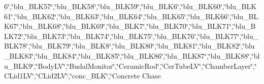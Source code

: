 {6\char`\"{},\char`\"{}blu\-\_\-\-B\-L\-K57\char`\"{},\char`\"{}blu\-\_\-\-B\-L\-K58\char`\"{},\char`\"{}blu\-\_\-\-B\-L\-K59\char`\"{},\char`\"{}blu\-\_\-\-B\-L\-K6\char`\"{},\char`\"{}blu\-\_\-\-B\-L\-K60\char`\"{},\char`\"{}blu\-\_\-\-B\-L\-K61\char`\"{},\char`\"{}blu\-\_\-\-B\-L\-K62\char`\"{},\char`\"{}blu\-\_\-\-B\-L\-K63\char`\"{},\char`\"{}blu\-\_\-\-B\-L\-K64\char`\"{},\char`\"{}blu\-\_\-\-B\-L\-K65\char`\"{},\char`\"{}blu\-\_\-\-B\-L\-K66\char`\"{},\char`\"{}blu\-\_\-\-B\-L\-K67\char`\"{},\char`\"{}blu\-\_\-\-B\-L\-K68\char`\"{},\char`\"{}blu\-\_\-\-B\-L\-K69\char`\"{},\char`\"{}blu\-\_\-\-B\-L\-K7\char`\"{},\char`\"{}blu\-\_\-\-B\-L\-K70\char`\"{},\char`\"{}blu\-\_\-\-B\-L\-K71\char`\"{},\char`\"{}blu\-\_\-\-B\-L\-K72\char`\"{},\char`\"{}blu\-\_\-\-B\-L\-K73\char`\"{},\char`\"{}blu\-\_\-\-B\-L\-K74\char`\"{},\char`\"{}blu\-\_\-\-B\-L\-K75\char`\"{},\char`\"{}blu\-\_\-\-B\-L\-K76\char`\"{},\char`\"{}blu\-\_\-\-B\-L\-K77\char`\"{},\char`\"{}blu\-\_\-\-B\-L\-K78\char`\"{},\char`\"{}blu\-\_\-\-B\-L\-K79\char`\"{},\char`\"{}blu\-\_\-\-B\-L\-K8\char`\"{},\char`\"{}blu\-\_\-\-B\-L\-K80\char`\"{},\char`\"{}blu\-\_\-\-B\-L\-K81\char`\"{},\char`\"{}blu\-\_\-\-B\-L\-K82\char`\"{},\char`\"{}blu\-\_\-\-B\-L\-K83\char`\"{},\char`\"{}blu\-\_\-\-B\-L\-K84\char`\"{},\char`\"{}blu\-\_\-\-B\-L\-K85\char`\"{},\char`\"{}blu\-\_\-\-B\-L\-K86\char`\"{},\char`\"{}blu\-\_\-\-B\-L\-K87\char`\"{},\char`\"{}blu\-\_\-\-B\-L\-K88\char`\"{},\char`\"{}blu\-\_\-\-B\-L\-K9\char`\"{},\char`\"{}Body\-L\-V\char`\"{},\char`\"{}Budal\-Monitor\char`\"{},\char`\"{}Ceramic\-Rod\char`\"{},\char`\"{}Cer\-Tube\-L\-V\char`\"{},\char`\"{}Chamber\-Layer\char`\"{},\char`\"{}C\-Lid1\-L\-V\char`\"{},\char`\"{}C\-Lid2\-L\-V\char`\"{},\char`\"{}conc\-\_\-\-B\-L\-K\char`\"{},\char`\"{}Concrete Chase }
